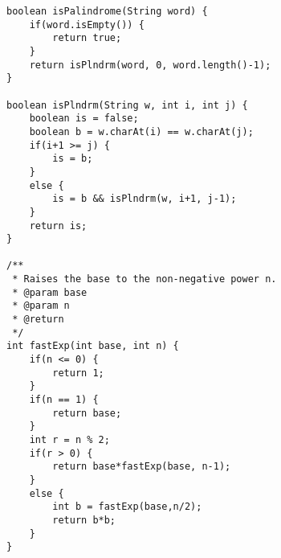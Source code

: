 \begin{lstlisting}
boolean isPalindrome(String word) {
    if(word.isEmpty()) {
        return true;
    }
    return isPlndrm(word, 0, word.length()-1);
}

boolean isPlndrm(String w, int i, int j) {
    boolean is = false;
    boolean b = w.charAt(i) == w.charAt(j);
    if(i+1 >= j) {
        is = b;
    }
    else {
        is = b && isPlndrm(w, i+1, j-1);
    }
    return is;
}

/**
 * Raises the base to the non-negative power n.
 * @param base
 * @param n
 * @return
 */
int fastExp(int base, int n) {
    if(n <= 0) {
        return 1;
    }
    if(n == 1) {
        return base;
    }
    int r = n % 2;
    if(r > 0) {
        return base*fastExp(base, n-1);
    }
    else {
        int b = fastExp(base,n/2);
        return b*b;
    }
}
\end{lstlisting}
